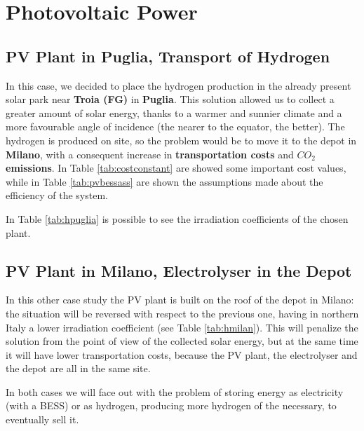 \section{Photovoltaic Power}

\subsection{PV Plant in Puglia, Transport of Hydrogen}
In this case, we decided to place the hydrogen production in the  already present solar park near \textbf{Troia (FG)} in \textbf{Puglia}. This solution allowed us to collect a greater amount of solar energy, thanks to a warmer and sunnier climate and a more favourable angle of incidence (the nearer to the equator, the better). The hydrogen is produced on site, so the problem would be to move it to the depot in \textbf{Milano}, with a consequent increase in \textbf{transportation costs} and \textbf{$CO_2$ emissions}. In Table \ref{tab:costconstant} are showed some important cost values, while in Table \ref{tab:pvbessass} are shown the assumptions made about the efficiency of the system.





\newpage
In Table \ref{tab:hpuglia} is possible to see the irradiation coefficients of the chosen plant.



\subsection{PV Plant in Milano, Electrolyser in the Depot}
In this other case study the PV plant is built on the roof of the depot in Milano: the situation will be reversed with respect to the previous one, having in northern Italy a lower irradiation coefficient (see Table \ref{tab:hmilan}). This will penalize the solution from the point of view of the collected solar energy, but at the same time it will have lower transportation costs, because the PV plant, the electrolyser and the depot are all in the same site.



In both cases we will face out with the problem of storing energy as electricity (with a BESS) or as hydrogen, producing more hydrogen of the necessary, to eventually sell it.